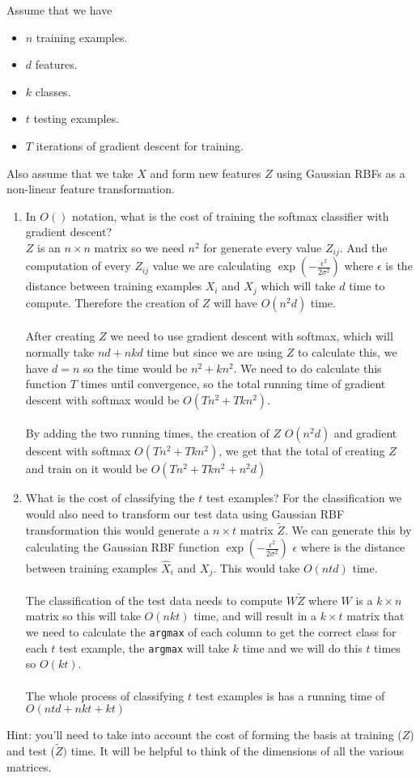 \documentclass{article}
\def\blu#1{{\color{blu}#1}}
\def\ans#1{{\color{ans}#1}}
\def\items#1{\begin{itemize}#1\end{itemize}}
\def\enum#1{\begin{enumerate}#1\end{enumerate}}
\begin{document}
Assume that we have
\items{
\item $n$ training examples.
\item $d$ features.
\item $k$ classes.
\item $t$ testing examples.
\item $T$ iterations of gradient descent for training.
}
Also assume that we take $X$ and form new features $Z$ using Gaussian RBFs as a non-linear feature transformation.
\blu{\enum{
\item In $O()$ notation, what is the cost of training the softmax classifier with gradient descent? \\ 
\ans{
    $Z$ is an $n \times n$ matrix so we need $n^2$ for generate every value $Z_{ij}$. And the 
    computation of every $Z_{ij}$ value we are calculating  $\exp(-\frac{\epsilon^2}{2\sigma^2})$ 
    where $\epsilon$ is the distance between training examples $X_i$ and $X_j$ which will take $d$ 
    time to compute. Therefore the creation of $Z$ will have $O(n^2d)$ time. \\ \\
    After creating $Z$ we need to use gradient descent with softmax, which will normally 
    take $nd + nkd$ time but since we are using $Z$ to calculate this, we have $d = n$ so the time would 
    be $n^2 +kn^2$. We need to do calculate this function $T$ times until convergence, so the total 
    running time of gradient descent with softmax would be $O(Tn^2 +Tkn^2)$. \\ \\
    By adding the two running times, the creation of $Z$ $O(n^2d)$ and gradient descent with softmax 
    $O(Tn^2 +Tkn^2)$, we get that the total of creating $Z$ and train on it would be 
    $O(Tn^2 + Tkn^2 + n^2d)$
}
\item What is the cost of classifying the $t$ test examples?
\ans{
    For the classification we would also need to transform our test data using Gaussian RBF transformation 
    this would generate a $n \times t$ matrix $\tilde{Z}$. We can generate this by calculating 
    the Gaussian RBF function $\exp(-\frac{\epsilon^2}{2\sigma^2})$ $\epsilon$ where is the distance 
    between training examples $\hat{X}_i$ and $X_j$. This would take $O(ntd)$ time.\\ \\
    The classification of the test data needs to compute $W\tilde{Z}$ where $W$ is a $k \times n$ matrix 
    so this will take $O(nkt)$ time, and will result in a $k \times t$ matrix that we need to calculate 
    the \texttt{argmax} of each column to get the correct class for each $t$ test example, the
    \texttt{argmax} will take $k$ time and we will do this $t$ times so $O(kt)$. \\ \\
    The whole process of classifying $t$ test examples is has a running time of $O(ntd + nkt + kt)$
}
}
}
Hint: you'll need to take into account the cost of forming the basis at training ($Z$) and test ($\tilde{Z})$ time. It will be helpful to think of the dimensions of all the various matrices. 
\end{document}
